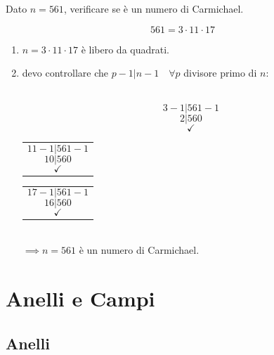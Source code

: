 \documentclass[a4paper,12pt, oneside]{book}
\begin{document}
\begin{shaded}
	\begin{esempio}
		Dato $n=561$, verificare se è un numero di Carmichael.

		$$561=3 \cdot 11 \cdot 17$$

		\begin{enumerate}
			\item $n= 3 \cdot 11 \cdot 17$ è libero da quadrati.\\
			\item devo controllare che $p-1|n-1 \quad \forall p $ divisore primo di $n$:\\\\
			      \begin{minipage}{0.25\textwidth}

				      $$3-1 | 561-1$$
				      $$2|560$$
				      $$\checkmark$$

			      \end{minipage}%
			      \hfill
			      \begin{minipage}{0.25\textwidth}
				      \begin{tabular}{|p{\textwidth}}

					      $$11-1 | 561-1$$
					      $$10|560$$
					      $$\checkmark$$
				      \end{tabular}
			      \end{minipage}%
			      \hfill
			      \begin{minipage}{0.25\textwidth}
				      \begin{tabular}{|p{\textwidth}}

					      $$17-1 | 561-1$$
					      $$16|560$$
					      $$\checkmark$$
				      \end{tabular}
			      \end{minipage}\\%

			      $\implies n = 561$ è un numero di Carmichael.

		\end{enumerate}

	\end{esempio}
\end{shaded}


\chapter{Anelli e Campi}
\section{Anelli}
\end{document}
